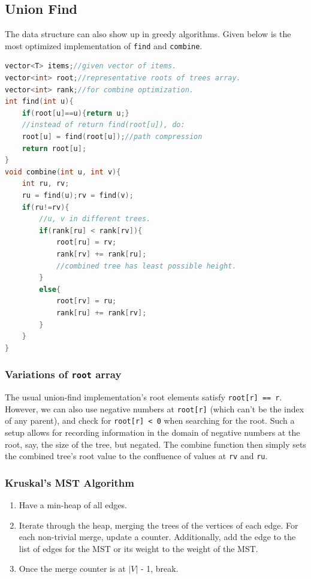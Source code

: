 \documentclass{report}
\begin{document}
\subsection{Union Find}
The data structure can also show up in greedy algorithms.
Given below is the most optimized implementation of \texttt{find} and \texttt{combine}.
\begin{lstlisting}[language=C++]
vector<T> items;//given vector of items.
vector<int> root;//representative roots of trees array.
vector<int> rank;//for combine optimization.
int find(int u){
    if(root[u]==u){return u;}
    //instead of return find(root[u]), do:
    root[u] = find(root[u]);//path compression
    return root[u];
}
void combine(int u, int v){
    int ru, rv;
    ru = find(u);rv = find(v);
    if(ru!=rv){
        //u, v in different trees.
        if(rank[ru] < rank[rv]){
            root[ru] = rv;
            rank[rv] += rank[ru];
            //combined tree has least possible height.
        }
        else{
            root[rv] = ru;
            rank[ru] += rank[rv];
        }
    }
}
\end{lstlisting}
\subsubsection*{Variations of \texttt{root} array}
The usual union-find implementation's root elements satisfy 
\texttt{root[r] == r}. However, we can also use negative numbers
at \texttt{root[r]} (which can't be the index of any parent),
and check for \texttt{root[r] < 0} when searching for the root. Such
a setup allows for recording information in the domain of negative
numbers at the root, say, the size of the tree, but negated. The
combine function then simply sets the combined tree's
root value to the confluence of values at \texttt{rv} and
\texttt{ru}.
\subsubsection*{Kruskal's MST Algorithm}
\begin{enumerate}
    \item Have a min-heap of all edges.
    \item Iterate through the heap, merging the trees of the vertices
    of each edge. For each non-trivial merge, update a counter. Additionally, add the edge to the list of edges for the MST or
    its weight to the weight of the MST.
    \item Once the merge counter is at $|V|$ - 1, break.
\end{enumerate}
\end{document}
